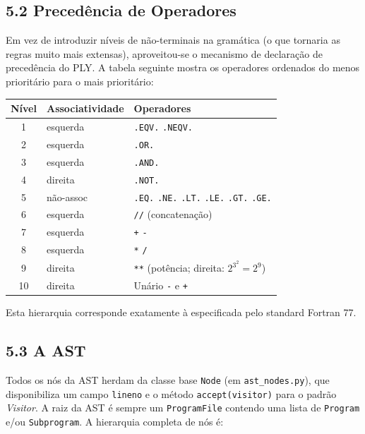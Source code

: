 \documentclass[a4paper]{article}
\begin{document}
\subsection*{5.2 Precedência de Operadores}

\noindent Em vez de introduzir níveis de não-terminais na gramática (o que tornaria as regras muito mais extensas), aproveitou-se o mecanismo de declaração de precedência do PLY. A tabela seguinte mostra os operadores ordenados do menos prioritário para o mais prioritário:

\begin{center}
\begin{tabular}{cll}
\toprule
\textbf{Nível} & \textbf{Associatividade} & \textbf{Operadores} \\
\midrule
1 & esquerda  & \texttt{.EQV.} \quad \texttt{.NEQV.} \\
2 & esquerda  & \texttt{.OR.} \\
3 & esquerda  & \texttt{.AND.} \\
4 & direita   & \texttt{.NOT.} \\
5 & não-assoc & \texttt{.EQ.} \quad \texttt{.NE.} \quad \texttt{.LT.} \quad \texttt{.LE.} \quad \texttt{.GT.} \quad \texttt{.GE.} \\
6 & esquerda  & \texttt{//} (concatenação) \\
7 & esquerda  & \texttt{+} \quad \texttt{-} \\
8 & esquerda  & \texttt{*} \quad \texttt{/} \\
9 & direita   & \texttt{**} (potência; direita: $2^{3^2} = 2^9$) \\
10 & direita  & Unário \texttt{-} e \texttt{+} \\
\bottomrule
\end{tabular}
\end{center}

\vspace{0.2cm}

\noindent Esta hierarquia corresponde exatamente à especificada pelo standard Fortran 77.

\subsection*{5.3 A AST}

\noindent Todos os nós da AST herdam da classe base \texttt{Node} (em \texttt{ast\_nodes.py}), que disponibiliza um campo \texttt{lineno} e o método \texttt{accept(visitor)} para o padrão \textit{Visitor}. A raiz da AST é sempre um \texttt{ProgramFile} contendo uma lista de \texttt{Program} e/ou \texttt{Subprogram}. A hierarquia completa de nós é:
\end{document}
